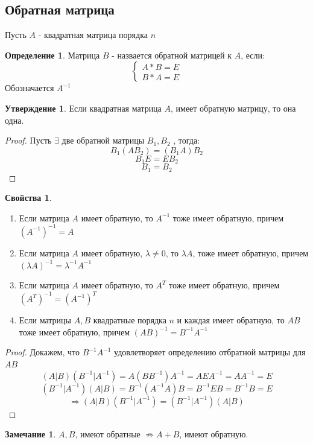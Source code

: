\documentclass[a4paper, 12pt]{article}
\newcommand\tab[1][.5cm]{\hspace*{#1}}
\theoremstyle{definition}
\newtheorem*{definition}{Определение}
\newtheorem*{subtheorem}{Утверждение}
\newtheorem*{remark}{Замечание}
\newtheorem*{properties}{Свойства}
\begin{document}
  \subsection{Обратная матрица}
  Пусть $A$ - квадратная матрица порядка $n$ 
  \begin{definition}
    Матрица $B$ - назвается обратной матрицей к $A$, если:
    $$\begin{cases}
      A * B = E \\
      B * A = E
    \end{cases}$$
    Обозначается $A^{-1}$ 
  \end{definition} 
  \begin{subtheorem}
    Если квадратная матрица $A$, имеет обратную матрицу, то она одна. 
  \end{subtheorem} 
  \begin{proof}
    Пусть $\exists $ две обратной матрицы $B_1, B_2$ , тогда: 
    $$B_1(AB_2) = (B_1A)B_2$$ 
    $$B_1 E = E B_2$$
    $$B_1 = B_2$$  
  \end{proof} 
  \begin{properties}  \tab
    \begin{enumerate}
      \item Если матрица $A$ имеет обратную, то $A^{-1}$ тоже имеет обратную, причем \\$(A^{-1})^{-1} = A$ \label{pro1} 
      \item Если матрица $A$ имеет обратную, $\lambda \not =0$, то $\lambda A$, тоже имеет обратную, причем $(\lambda A)^{-1} = \lambda^{-1} A^{-1}$ 
      \item Если матрица $A$ имеет обратную, то $A^{T}$ тоже имеет обратную, причем \\$(A^{T})^{-1} = (A^{-1})^{T}$
      \item Если матрицы $A,B$ квадратные порядка $n$ и каждая имеет обратную, то $AB$ тоже имеет обратную, причем $(AB)^{-1} = B^{-1}A^{-1}$ \label{pro4} 
    \end{enumerate}
  \end{properties}
  \begin{proof}
    Докажем, что $B^{-1} A^{-1} $ удовлетворяет определению отбратной матрицы для $AB$ 
    $$(A|B)(B^{-1}|A^{-1}) = A(BB^{-1})A^{-1} = AEA^{-1} = AA^{-1} = E$$
    $$(B^{-1}|A^{-1})(A|B) = B^{-1}(A^{-1}A)B = B^{-1}EB = B^{-1}B=E$$  
    $$\Longrightarrow (A|B)(B^{-1}|A^{-1}) = (B^{-1}|A^{-1})(A|B)$$ 
  \end{proof} 
  \begin{remark}
    $A,B$, имеют обратные $\not \Rightarrow A+B$, имеют обратную.
  \end{remark} 
\end{document}
